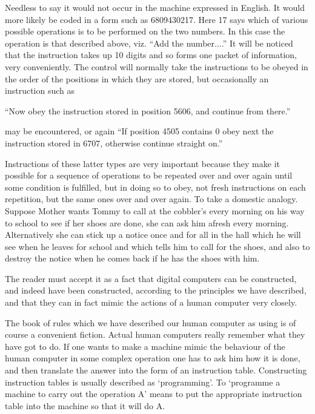 \documentclass[10pt]{article} %
\begin{document}
Needless to say it would not occur in the machine expressed in English. It would more likely be coded in a form such as 6809430217. Here 17 says which of various possible operations is to be performed on the two numbers. In this case the operation is that described above, viz. ``Add the number....'' It will be noticed that the instruction takes up 10 digits and so forms one packet of information, very conveniently. The control will normally take the instructions to be obeyed in the order of the positions in which they are stored, but occasionally an instruction such as

\vspace{0.5\baselineskip} %
``Now obey the instruction stored in position 5606, and continue from there.''\par %
\vspace{0.5\baselineskip} %
may be encountered, or again
\vspace{0.5\baselineskip} %
``If position 4505 contains 0 obey next the instruction stored in 6707, otherwise continue straight on.''\par %
\vspace{0.5\baselineskip} %
Instructions of these latter types are very important because they make it possible for a sequence of operations to be repeated over and over again until some condition is fulfilled, but in doing so to obey, not fresh instructions on each repetition, but the same ones over and over again. To take a domestic analogy. Suppose Mother wants Tommy to call at the cobbler's every morning on his way to school to see if her shoes are done, she can ask him afresh every morning. Alternatively she can stick up a notice once and for all in the hall which he will see when he leaves for school and which tells him to call for the shoes, and also to destroy the notice when he comes back if he has the shoes with him.

The reader must accept it as a fact that digital computers can be constructed, and indeed have been constructed, according to the principles we have described, and that they can in fact mimic the actions of a human computer very closely.

The book of rules which we have described our human computer as using is of course a convenient fiction. Actual human computers really remember what they have got to do. If one wants to make a machine mimic the behaviour of the human computer in some complex operation one has to ask him how it is done, and then translate the answer into the form of an instruction table. Constructing instruction tables is usually described as `programming'. To `programme a machine to carry out the operation A' means to put the appropriate instruction table into the machine so that it will do A.
\end{document}
